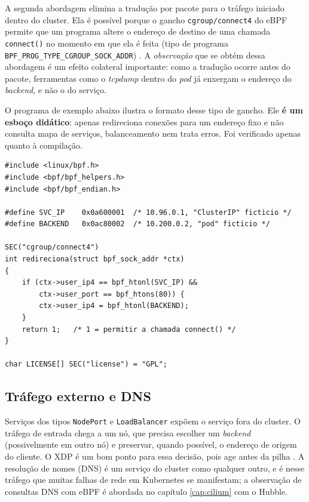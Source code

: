 A segunda abordagem elimina a tradução por pacote para o tráfego iniciado dentro do
cluster. Ela é possível porque o gancho \texttt{cgroup/connect4} do eBPF permite que um
programa altere o endereço de destino de uma chamada \texttt{connect()} no momento em
que ela é feita (tipo de programa \texttt{BPF\_PROG\_TYPE\_CGROUP\_SOCK\_ADDR})
\cite{linuxkernel2024}. A \textit{observação} que se obtém dessa abordagem é um efeito
colateral importante: como a tradução ocorre antes do pacote, ferramentas como o
\textit{tcpdump} dentro do \textit{pod} já enxergam o endereço do \textit{backend}, e
não o do serviço.

O programa de exemplo abaixo ilustra o formato desse tipo de gancho. Ele
\textbf{é um esboço didático}: apenas redireciona conexões para um endereço fixo e não
consulta mapa de serviços, balanceamento nem trata erros. Foi verificado apenas
quanto à compilação.

\begin{lstlisting}[caption={Esboço de redirecionamento no gancho cgroup/connect4 (didático).}, label=lst:k8s-connect4]
#include <linux/bpf.h>
#include <bpf/bpf_helpers.h>
#include <bpf/bpf_endian.h>

#define SVC_IP    0x0a600001  /* 10.96.0.1, "ClusterIP" ficticio */
#define BACKEND   0x0ac80002  /* 10.200.0.2, "pod" ficticio */

SEC("cgroup/connect4")
int redireciona(struct bpf_sock_addr *ctx)
{
    if (ctx->user_ip4 == bpf_htonl(SVC_IP) &&
        ctx->user_port == bpf_htons(80)) {
        ctx->user_ip4 = bpf_htonl(BACKEND);
    }
    return 1;   /* 1 = permitir a chamada connect() */
}

char LICENSE[] SEC("license") = "GPL";
\end{lstlisting}

\subsection*{Tráfego externo e DNS}

Serviços dos tipos \texttt{NodePort} e \texttt{LoadBalancer} expõem o serviço fora do
cluster. O tráfego de entrada chega a um nó, que precisa escolher um \textit{backend}
(possivelmente em outro nó) e preservar, quando possível, o endereço de origem do
cliente. O XDP é um bom ponto para essa decisão, pois age antes da pilha
\cite{ciliumdocs}. A resolução de nomes (DNS) é um serviço do cluster como qualquer
outro, e é nesse tráfego que muitas falhas de rede em Kubernetes se manifestam; a
observação de consultas DNS com eBPF é abordada no capítulo \ref{cap:cilium} com o
Hubble.

